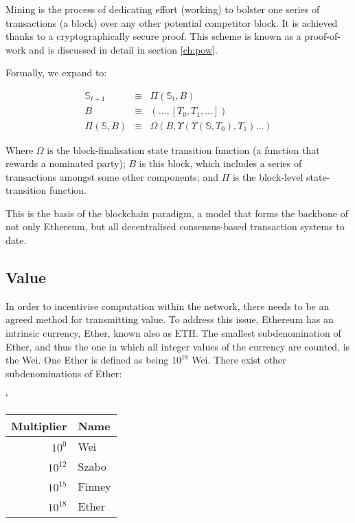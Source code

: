 \documentclass[9pt,oneside]{amsart}
\begin{document}
\begin{multicols}{2}
Mining is the process of dedicating effort (working) to bolster one series of transactions (a block) over any other potential competitor block. It is achieved thanks to a cryptographically secure proof. This scheme is known as a proof-of-work and is discussed in detail in section \ref{ch:pow}.

Formally, we expand to:

\begin{eqnarray}
\mathbb{S}_{t+1} & \equiv & \Pi(\mathbb{S}_t, B) \\
B & \equiv & (..., [ T_0, T_1, ... ]) \\
\Pi(\mathbb{S}, B) & \equiv & \Omega(B, \Upsilon(\Upsilon(\mathbb{S}, T_0), T_1) ...)
\end{eqnarray}

Where $\Omega$ is the block-finalisation state transition function (a function that rewards a nominated party); $B$ is this block, which includes a series of transactions amongst some other components; and $\Pi$ is the block-level state-transition function.

This is the basis of the blockchain paradigm, a model that forms the backbone of not only Ethereum, but all decentralised consensus-based transaction systems to date.

\subsection{Value}

In order to incentivise computation within the network, there needs to be an agreed method for transmitting value. To address this issue, Ethereum has an intrinsic currency, Ether, known also as {\small ETH}. The smallest subdenomination of Ether, and thus the one in which all integer values of the currency are counted, is the Wei. One Ether is defined as being $10^{18}$ Wei. There exist other subdenominations of Ether:
\par`
\begin{center}
\begin{tabular}{rl}
\toprule
Multiplier & Name \\
\midrule
$10^0$ & Wei \\
$10^{12}$ & Szabo \\
$10^{15}$ & Finney \\
$10^{18}$ & Ether \\
\bottomrule
\end{tabular}
\end{center}
\par


\end{multicols}
\end{document}

